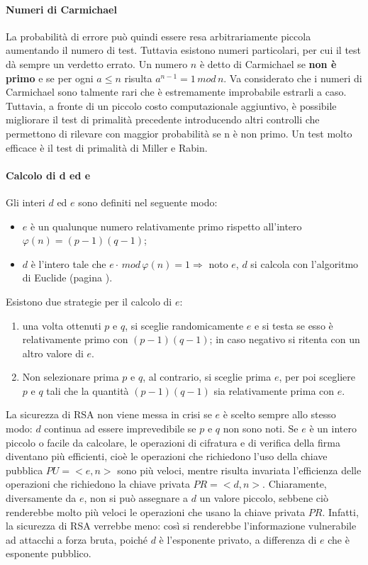 \paragraph{Numeri di Carmichael}
La probabilità di errore può quindi essere resa arbitrariamente piccola aumentando il numero di test. Tuttavia esistono numeri particolari, per cui il test dà sempre un verdetto errato. Un numero $n$ è detto di Carmichael se \textbf{non è primo} e se per ogni $a \le n$ risulta $a^{n-1} = 1 \, mod \, n$. Va considerato che i numeri di Carmichael sono talmente rari che è estremamente improbabile estrarli a caso. Tuttavia, a fronte di un piccolo costo computazionale aggiuntivo, è possibile migliorare il test di primalità precedente introducendo altri controlli che permettono di rilevare con maggior probabilità se n è non primo. Un test molto efficace è il test di primalità di Miller e Rabin.

\paragraph{Calcolo di d ed e}

Gli interi $d$ ed $e$ sono definiti nel seguente modo: 
\begin{itemize}
\item $e$ è un qualunque numero relativamente primo rispetto all'intero $\varphi(n) = (p-1)(q-1)$;
\item $d$ è l'intero tale che $e \cdot \, mod \, \varphi(n) = 1 \Rightarrow$ noto $e$, $d$ si calcola con l'algoritmo di Euclide (pagina \pageref{eq:euclide}). 
\end{itemize}
Esistono due strategie per il calcolo di $e$:
\begin{enumerate}
\item una volta ottenuti $p$ e $q$, si sceglie randomicamente $e$ e si testa se esso è relativamente primo con $(p-1)(q-1)$; in caso negativo si ritenta con un altro valore di $e$.
\item Non selezionare prima $p$ e $q$, al contrario, si sceglie prima $e$, per poi scegliere $p$ e $q$ tali che la quantità $(p-1)(q-1)$ sia relativamente prima con $e$.
\end{enumerate}
La sicurezza di RSA non viene messa in crisi se $e$ è scelto sempre allo stesso modo: $d$ continua ad essere imprevedibile se $p$ e $q$ non sono noti. Se $e$ è un intero piccolo o facile da calcolare, le operazioni di cifratura e di verifica della firma diventano più efficienti, cioè le operazioni che richiedono l'uso della chiave pubblica $PU = <e,n>$ sono più veloci, mentre risulta invariata l'efficienza delle operazioni che richiedono la chiave privata $PR = <d,n>$. Chiaramente, diversamente da $e$, non si può assegnare a $d$ un valore piccolo, sebbene ciò renderebbe molto più veloci le operazioni che usano la chiave privata $PR$. Infatti, la sicurezza di RSA verrebbe meno: così si renderebbe l'informazione vulnerabile ad attacchi a forza bruta, poiché $d$ è l'esponente privato, a differenza di $e$ che è esponente pubblico. 

